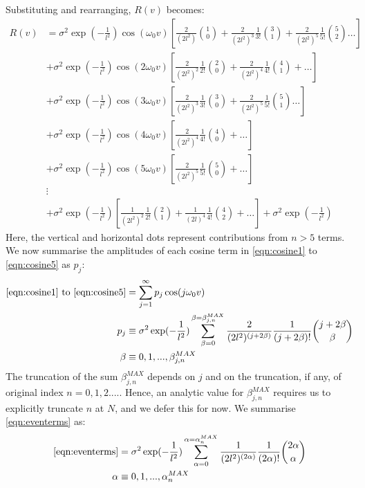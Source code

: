 Substituting and rearranging, $R(v)$ becomes:
\begin{align}
R(v) &= \sigma^2 \exp (- \frac{1}{l^2}) \cos(\omega_0 v) \left[ \frac{2}{(2l^2)}\binom{1}{0} + \frac{2}{(2l^2)^3} \frac{1}{3!} \binom{3}{1} +  \frac{2}{(2l^2)^5} \frac{1}{5!}\binom{5}{2} \dots \right] \label{eqn:cosine1}\\
& + \sigma^2 \exp (- \frac{1}{l^2}) \cos(2\omega_0 v) \left[ \frac{2}{(2l^2)^2} \frac{1}{2!} \binom{2}{0} + \frac{2}{(2l^2)^4} \frac{1}{4!} \binom{4}{1} + \dots \right] \\
& + \sigma^2 \exp (- \frac{1}{l^2}) \cos(3\omega_0 v) \left[ \frac{2}{(2l^2)^3} \frac{1}{3!} \binom{3}{0} + \frac{2}{(2l^2)^5} \frac{1}{5!}\binom{5}{1} \dots \right] \\
& + \sigma^2 \exp (- \frac{1}{l^2}) \cos(4\omega_0 v) \left[ \frac{2}{(2l^2)^4} \frac{1}{4!} \binom{4}{0} + \dots \right] \\
& + \sigma^2 \exp (- \frac{1}{l^2}) \cos(5\omega_0 v) \left[ \frac{2}{(2l^2)^5} \frac{1}{5!}\binom{5}{0} + \dots \right] \label{eqn:cosine5}\\
& \vdots \nonumber \\
& + \sigma^2 \exp (- \frac{1}{l^2}) \left[ \frac{1}{(2l^2)^2} \frac{1}{2!} \binom{2}{1} + \frac{1}{(2l)^4} \frac{1}{4!} \binom{4}{2} + \dots \right] + \sigma^2 \exp (- \frac{1}{l^2}) \label{eqn:eventerms}
\end{align}
Here, the vertical and horizontal dots represent contributions from $n>5$ terms. We now summarise the amplitudes of each cosine term in \ref{eqn:cosine1} to  \ref{eqn:cosine5} as $p_j$:
\begin{align}
\text{\ref{eqn:cosine1} to  \ref{eqn:cosine5}} & =\sum_{j=1}^{\infty} p_j \cos(j\omega_0 v) \label{eqn:beta_series1} \\
p_j & \equiv \sigma^2 \exp (- \frac{1}{l^2}) \sum_{\beta = 0}^{\beta = \beta_{j,n}^{MAX}} \frac{2}{(2l^2)^{(j + 2\beta)}} \frac{1}{(j + 2\beta)!} \binom{j + 2\beta}{\beta} \label{eqn:beta_series2} \\
\beta &\equiv  0,1,..., \beta_{j,n}^{MAX} 
\end{align}
The truncation of the sum $\beta_{j,n}^{MAX}$ depends on $j$ and on the truncation, if any, of original index $n = 0,1,2....$. Hence, an analytic value for $\beta_{j,n}^{MAX}$ requires us to explicitly truncate $n$ at $N$, and we defer this for now. We summarise \ref{eqn:eventerms} as:
\begin{align}
\text{\ref{eqn:eventerms}} &= \sigma^2 \exp (- \frac{1}{l^2}) \sum_{\alpha = 0}^{\alpha = \alpha_{n}^{MAX}} \frac{1}{(2l^2)^{(2\alpha)}} \frac{1}{(2\alpha)!} \binom{2\alpha}{\alpha} \label{eqn:alpha_series}\\
\alpha &\equiv  0,1,..., \alpha_{n}^{MAX} 
\end{align}
